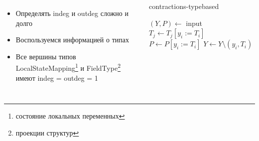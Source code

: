 \documentclass{beamer}
\begin{document}
\begin{frame}
\begin{columns}
    \begin{itemize}
      \item Определять indeg и outdeg сложно и долго
      \item Воспользуемся информацией о типах
      \item Все вершины типов LocalStateMapping\footnote{состояние локальных переменных} и FieldType\footnote{проекции структур} имеют indeg = outdeg = 1
    \end{itemize}
    \begin{megaalgorithm}\tiny
      \caption{\tiny contractions-typebased}
    \begin{algorithmic}
      \State $(Y, P)\gets$ input
          \If{\textcolor{red}{$typeof(y_i)$ is $LocalStateMapping$ or $FieldType$}}
                  \State $T_j \gets T_j [y_i := T_i]$
              \EndFor
              \State $P \gets P [y_i := T_i]$
              \State $Y\gets Y \setminus (y_i, T_i)$
          \EndIf
      \EndFor
      \State {}
    \end{algorithmic}
  \end{megaalgorithm} 
    \end{columns}
\end{frame}
\end{document}
